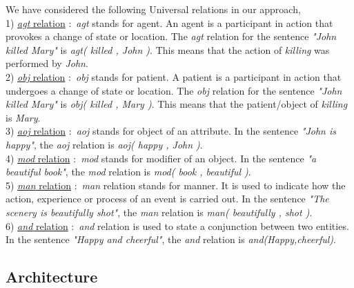 We have considered the following Universal relations in our approach,\\ 
1) \underline{\textit{agt} relation} \(:\) \textit{agt} stands for agent. An agent is a participant in action that provokes a change of state or location. The \textit{agt} 
relation for the sentence \textit{"John killed Mary"} is \textit{agt( killed , John )}. This means that the action of \textit{killing} was performed by \textit{John}.\\
2) \underline{\textit{obj} relation} \(:\) \textit{obj} stands for patient. A patient is a participant in action that undergoes a change of state or location. The \textit{obj} 
relation for the sentence \textit{"John killed Mary"} is \textit{obj( killed , Mary )}. This means that the patient/object of \textit{killing} is \textit{Mary}.\\
3) \underline{\textit{aoj} relation} \(:\) \textit{aoj} stands for object of an attribute. In the sentence \textit{"John is happy"}, the \textit{aoj} relation is 
\textit{aoj( happy , John )}.\\
4) \underline{\textit{mod} relation} \(:\) \textit{mod} stands for modifier of an object. In the sentence \textit{"a beautiful book"}, the \textit{mod} relation is 
\textit{mod( book , beautiful )}.\\
5) \underline{\textit{man} relation} \(:\) \textit{man} relation stands for manner. It is used to indicate how the action, experience or process of an event is carried out. 
In the sentence \textit{"The scenery is beautifully shot"}, the \textit{man} relation is \textit{man( beautifully , shot )}.\\
6) \underline{\textit{and} relation} \(:\) \textit{and} relation is used to state a conjunction between two entities. In the sentence \textit{"Happy and cheerful"}, 
the \textit{and} relation is \textit{and(Happy,cheerful)}.
    
\subsection*{Architecture}
  
